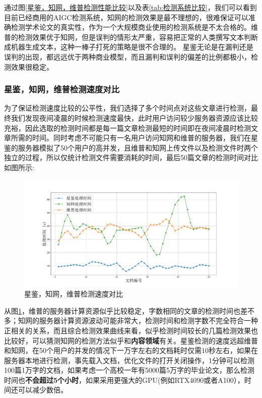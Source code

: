 \documentclass[a4paper]{report}
\begin{document}
通过图\ref{星鉴，知网，维普检测性能比较}以及表\ref{tab:检测系统比较}，我们可以看到目前已经商用的AIGC检测系统，知网的检测效果是最不理想的，很难保证可以准确检测学术论文的真实性，作为一个大规模商业使用的检测系统是不太合格的。维普的检测效果优于知网，但是误判的情形太严重，容易把正常的人类撰写文本判断成机器生成文本，这种一棒子打死的策略是很不合理的。
星鉴无论是在漏判还是误判的出现，都远远优于两种商业模型，而且漏判和误判的偏差的比例都极小，检测效果很稳定。
\subsubsection{星鉴，知网，维普检测速度对比}
为了保证检测速度比较的公平性，我们选择了多个时间点对这些文章进行检测，最终我们发现夜间凌晨的时候检测速度最快，此时用户访问较少服务器资源应该比较充裕，因此选取的检测时间都是每一篇文章检测最短的时间即在夜间凌晨时检测文章所需的时间。同时考虑不可能只有一名用户访问知网和维普的服务器，我们在星鉴的服务器模拟了50个用户的高并发，且维普和知网上传文件以及检测文件时两个独立的过程，所以仅统计检测文件需要消耗的时间，最后50篇文章的检测时间对比如图所示:
\begin{figure}[H]
	\centering
	\includegraphics[width=\textwidth]{figures/星鉴速度对比图.pdf}
	\caption{星鉴，知网，维普检测速度对比}
	\label{星鉴，知网，维普检测速度对比}
\end{figure}
从图\ref{星鉴，知网，维普检测速度对比}，维普的服务器计算资源似乎比较稳定，字数相同的文章的检测时间也差不多；知网的服务器计算资源波动可能非常大，检测时间和检测字数不完全符合一种正相关的关系，而且综合检测效果曲线来看，似乎检测时间较长的几篇检测效果也比较好，可以猜测知网的检测方法似乎和\textbf{内容领域}有关。星鉴检测的速度远超维普和知网，在50个用户的并发的情况下一万字左右的文档耗时仅需10秒左右，如果在服务器本地进行检测，事先载入文档，优化文件的打开关闭操作，1分钟可以检测100篇1万字的文档，如果考虑一个高校一年有5000篇5万字的毕业论文，那么检测时间也\textbf{不会超过5个小时}，如果采用更强大的GPU(例如RTX4090或者A100），时间还可以减少数倍。
\end{document}
